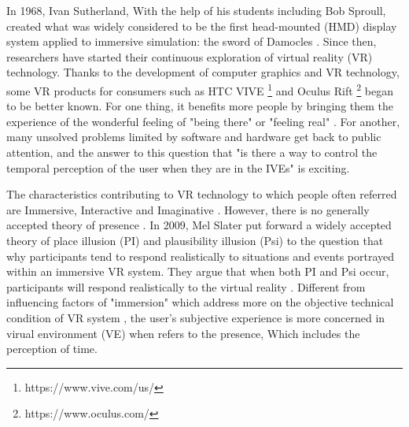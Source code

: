 \documentclass[sigconf]{acmart}
\begin{document}
In 1968, Ivan Sutherland, With the help of his students including Bob Sproull, created what was widely considered to be the first head-mounted (HMD) display system applied to immersive simulation: the sword of Damocles \cite{sutherland1968head}. Since then, researchers have started their continuous exploration of virtual reality (VR) technology. Thanks to the development of computer graphics and VR technology, some VR products for consumers such as HTC VIVE \footnote[1]{https://www.vive.com/us/} and Oculus Rift \footnote[2]{https://www.oculus.com/} began to be better known. For one thing, it benefits more people by bringing them the experience of the wonderful feeling of "being there" \cite{held1992telepresence,sheridan1992musings,barfield1993sense,slater1997framework,draper1998telepresence,bystrom1999conceptual,sanchez2005presence} or "feeling real" \cite{parola2016turning}. For another, many unsolved problems limited by software and hardware get back to public attention, and the answer to this question that "is there a way to control the temporal perception of the user when they are in the IVEs" is exciting.


The characteristics contributing to VR technology to which people often referred are Immersive, Interactive and Imaginative \cite{Burdea:1994:VRT:177812}. However, there is no generally accepted theory of presence \cite{ijsselsteijn2000presence,birkenbusch2013concepts,skarbez2016plausibility,darken1999quantitative}. In 2009, Mel Slater put forward a widely accepted theory of place illusion (PI) and plausibility illusion (Psi) to the question that why participants tend to respond realistically to situations and events portrayed within an immersive VR system. They argue that when both PI and Psi occur, participants will respond realistically to the virtual reality \cite{slater2009place}. Different from influencing factors of "immersion" which address more on the objective technical condition of VR system \cite{bowman2007virtual,slater1999measuring,riva2011intention,slater1997framework}, the user's subjective experience is more concerned in virual environment (VE) when refers to the presence, Which includes the perception of time.
\end{document}
